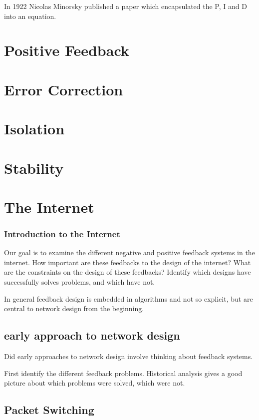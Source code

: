 In 1922 Nicolas Minorsky published a paper which encapsulated the P, I and D into an
equation.\cite{minorsky1922}

\section{Positive Feedback}

\section{Error Correction}

\section{Isolation}

\section{Stability}

\section{The Internet}

\subsubsection{Introduction to the Internet}

Our goal is to examine the different negative and positive feedback systems in the internet. How
important are these feedbacks to the design of the internet? What are the constraints on the design
of these feedbacks? Identify which designs have successfully solves problems, and which have not.

In general feedback design is embedded in algorithms and not so explicit, but are central to network
design from the beginning. 

\subsection{early approach to network design}

Did early approaches to network design involve thinking about feedback systems.

First identify the different feedback problems. Historical analysis gives a good picture about which
problems were solved, which were not.

\subsection{Packet Switching}

